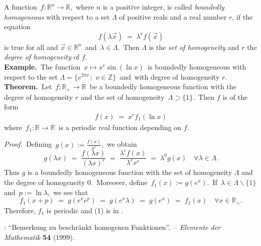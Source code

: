 \documentclass[12pt]{article}
\theoremstyle{definition}
\begin{document}
A function \,$f\!: \mathbb{R}^n \to \mathbb{R}$,\, where $n$ is a positive integer, is called \emph{boundedly homogeneous} with respect to a set $\Lambda$ of positive reals and a real number $r$, if the equation
   $$f(\lambda \vec{x}) \;=\; \lambda^r f(\vec{x})$$
is true for all and $\vec{x} \in \mathbb{R}^n$\, and\, $\lambda \in \Lambda$.\, Then $\Lambda$ is the \emph{set of homogeneity} and $r$ the \emph{degree of homogeneity} of $f$. \\

\textbf{Example.}\, The function\, $x \mapsto x^r\sin(\ln{x})$\, is boundedly homogeneous with respect to the set 
$\Lambda = \{e^{2\pi\nu}\,\vdots\;\; \nu \in \mathbb{Z}\}$\, and\, with degree of homogeneity $r$.\\


\textbf{Theorem.}\, Let\, $f\!: \mathbb{R}_+ \to \mathbb{R}$\, be a boundedly homogeneous function with the degree of homogeneity $r$ and the set of homogeneity\, $\Lambda \supset \{1\}$.\, Then $f$ is of the form
\begin{align}
f(x) \;=\; x^rf_1(\ln{x})
\end{align}
where\, $f_1\!: \mathbb{R} \to \mathbb{R}$\, is a periodic real function depending on $f$.

\emph{Proof.}\, Defining\, $g(x) := \frac{f(x)}{x^r}$,\, we obtain
$$g(\lambda x) \;=\; \frac{f(\lambda x)}{(\lambda x)^r} \;=\; \frac{\lambda^rf(x)}{\lambda^rx^r} \;=\; \lambda^0g(x) 
\quad \forall \lambda \in \Lambda.$$
Thus $g$ is a boundedly homogeneous function with the set of homogeneity $\Lambda$ and the degree of homogeneity 0.\, Moreover, define\, $f_1(x) := g(e^x)$.\, If\, $\lambda \in \Lambda\!\smallsetminus\!\{1\}$\, and\, $p := \ln\lambda$,\, 
we see that
$$f_1(x\!+\!p) \;=\; g(e^xe^p) \;=\; g(e^x\lambda) \;=\; g(e^x) \;=\; f_1(x) \quad \forall x \in \mathbb{R}_+.$$
Therefore, $f_1$ is periodic and (1) is in .

\begin{thebibliography}{8}
: ``Bemerkung zu beschr\"ankt homogenen Funktionen''.\, -- \emph{Elemente der Mathematik} \textbf{54} (1999).
\end{thebibliography}

\end{document}
